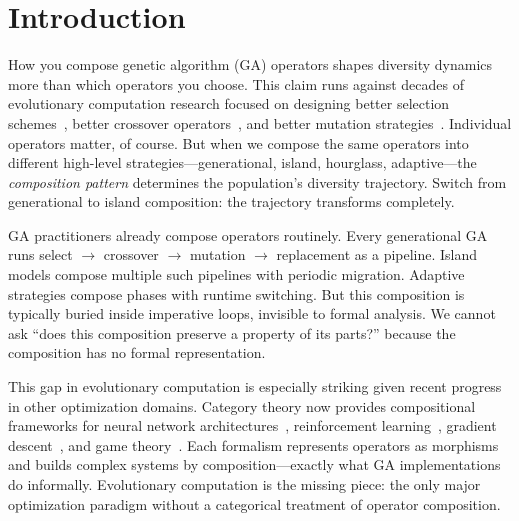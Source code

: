 \documentclass[dvipsnames,format=sigconf,anonymous=true,review=false]{acmart}
\begin{document}

\maketitle

\section{Introduction}

How you compose genetic algorithm (GA) operators shapes diversity dynamics more than which operators you choose. This claim runs against decades of evolutionary computation research focused on designing better selection schemes~\cite{blickle1996comparison}, better crossover operators~\cite{eshelman1993crossover}, and better mutation strategies~\cite{back1996evolutionary}. Individual operators matter, of course. But when we compose the same operators into different high-level strategies---generational, island, hourglass, adaptive---the \emph{composition pattern} determines the population's diversity trajectory. Switch from generational to island composition: the trajectory transforms completely.

GA practitioners already compose operators routinely. Every generational GA runs select $\to$ crossover $\to$ mutation $\to$ replacement as a pipeline. Island models compose multiple such pipelines with periodic migration. Adaptive strategies compose phases with runtime switching. But this composition is typically buried inside imperative loops, invisible to formal analysis. We cannot ask ``does this composition preserve a property of its parts?'' because the composition has no formal representation.

This gap in evolutionary computation is especially striking given recent progress in other optimization domains. Category theory now provides compositional frameworks for neural network architectures~\cite{gavranovic2024categorical}, reinforcement learning~\cite{bakirtzis2024compositional, hedges2024reinforcement}, gradient descent~\cite{hanks2024gradient}, and game theory~\cite{ghani2025approximate}. Each formalism represents operators as morphisms and builds complex systems by composition---exactly what GA implementations do informally. Evolutionary computation is the missing piece: the only major optimization paradigm without a categorical treatment of operator composition.
\end{document}
